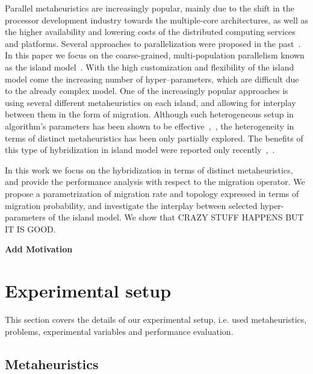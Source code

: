 \documentclass{sig-alternate}
\begin{document}

Parallel metaheuristics are increasingly popular, mainly due to the shift in the processor development industry towards the multiple-core architectures, as well as the higher availability and lowering costs of the distributed computing services and platforms.
Several approaches to parallelization were proposed in the past~\cite{cantu1998survey}.%
In this paper we focus on the coarse-grained, multi-population parallelism known as the island model~\cite{cantu1999topologies}.
With the high customization and flexibility of the island model come the increasing number of hyper--parameters, which are difficult due to the already complex model.
One of the increasingly popular approaches is using several different metaheuristics on each island, and allowing for interplay between them in the form of migration.
Although such heterogeneous setup in algorithm's parameters has been shown to be effective~\cite{jjmorelo2014pool},~\cite{gong2011}, the heterogeneity in terms of distinct metaheuristics has been only partially explored.
The benefits of this type of hybridization in island model were reported only recently~\cite{izzo2012},~\cite{thiago2014}.

In this work we focus on the hybridization in terms of distinct metaheuristics, and provide the performance analysis with respect to the migration operator.
We propose a parametrization of migration rate and topology expressed in terms of migration probability, and investigate the interplay between selected hyper-parameters of the island model.
We show that CRAZY STUFF HAPPENS BUT IT IS GOOD.

\textbf{Add Motivation}

\section{Experimental setup}
This section covers the details of our experimental setup, i.e. used metaheuristics, problems, experimental variables and performance evaluation.

\subsection{Metaheuristics}
\end{document}
